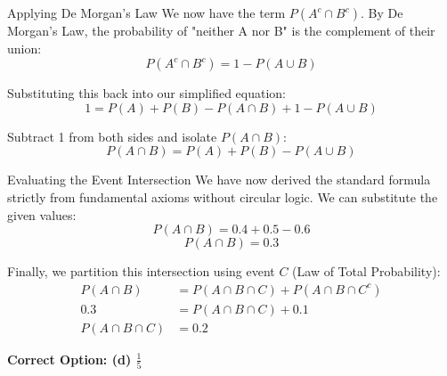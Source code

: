 \documentclass{beamer}
\begin{document}
\begin{frame}{Applying De Morgan's Law}
    We now have the term $P(A^c \cap B^c)$. By De Morgan's Law, the probability of "neither A nor B" is the complement of their union:
    \begin{equation}
        P(A^c \cap B^c) = 1 - P(A \cup B)
    \end{equation}
    
    Substituting this back into our simplified equation:
    \begin{equation}
        1 = P(A) + P(B) - P(A \cap B) + 1 - P(A \cup B)
    \end{equation}
    
    Subtract 1 from both sides and isolate $P(A \cap B)$:
    \begin{equation}
        P(A \cap B) = P(A) + P(B) - P(A \cup B)
    \end{equation}
\end{frame}

\begin{frame}{Evaluating the Event Intersection}
    We have now derived the standard formula strictly from fundamental axioms without circular logic. We can substitute the given values:
    \begin{equation}
        P(A \cap B) = 0.4 + 0.5 - 0.6
    \end{equation}
    \begin{equation}
        P(A \cap B) = 0.3
    \end{equation}
    
    Finally, we partition this intersection using event $C$ (Law of Total Probability):
    \begin{align}
        P(A \cap B) &= P(A \cap B \cap C) + P(A \cap B \cap C^c) \\
        0.3 &= P(A \cap B \cap C) + 0.1 \\
        P(A \cap B \cap C) &= 0.2
    \end{align}
    
    \vspace{0.2cm}
    \textbf{Correct Option: (d) $\frac{1}{5}$}
\end{frame}
\end{document}
